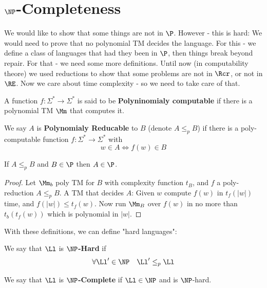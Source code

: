 \section{$\NP$-Completeness}
We would like to show that some things are not in $\P$. However - this is hard: We would need to prove that no polynomial TM decides the language. For this - we define a class of languages that had they been in $\P$, then things break beyond repair. For that - we need some more definitions. Until now (in computability theore) we used reductions to show that some problems are not in $\Rcr$, or not in $\RE$. Now we care about time complexity - so we need to take care of that.
\begin{yellowBox}
	\begin{defn}
		A function $f:\Sigma^*\to \Sigma^*$ is said to be \textbf{Polyninomialy computable} if there is a polynomial TM $\Mm$ that computes it.
	\end{defn}
\begin{defn}
	 We say $A$ is \textbf{Polynomialy Reducable} to $B$ (denote $A\leq_p B$) if there is a poly-computable function $f:\Sigma^*\to \Sigma^*$ with
	\[
	w\in A \iff f(w)\in B
	\]
\end{defn}
\end{yellowBox}
\begin{blueBox}
	\begin{thm}
		If $A\leq_p B$ and $B\in \P$ then $A\in \P$.
	\end{thm}
\end{blueBox}
\begin{proof}
	Let $\Mm_b$ poly TM for $B$ with complexity function $t_B$, and $f$ a poly-reduction $A\leq_p B$. A TM that decides $A$: Given $w$ compute $f(w)$ in $t_f(|w|)$ time, and $f(|w|)\leq t_f(w)$. Now run $\Mm_B$ over $f(w)$ in no more than $t_b(t_f(w))$ which is polynomial in $|w|$.
\end{proof}
With these definitions, we can define "hard languages":
\begin{yellowBox}
	\begin{defn}
		[$\NP $ - hard]We say that $\Ll$ is \textbf{$\NP$-Hard} if 
		\[
		\forall \Ll'\in \NP \quad \Ll'\leq_p \Ll
		\]
	\end{defn}
	\begin{defn}
		[$\NP $ - complete]We say that $\Ll$ is \textbf{$\NP$-Complete} if $\Ll\in \NP$ and is $\NP$-hard.\\
	\end{defn}
\end{yellowBox}
